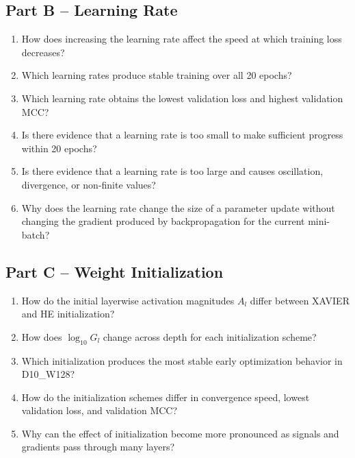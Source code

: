 \documentclass[11pt]{article}
\begin{document}
\subsection*{Part B -- Learning Rate}
\begin{enumerate}
    \item How does increasing the learning rate affect the speed at which training loss decreases?
    \item Which learning rates produce stable training over all 20 epochs?
    \item Which learning rate obtains the lowest validation loss and highest validation MCC?
    \item Is there evidence that a learning rate is too small to make sufficient progress within 20 epochs?
    \item Is there evidence that a learning rate is too large and causes oscillation, divergence, or non-finite values?
    \item Why does the learning rate change the size of a parameter update without changing the gradient produced by backpropagation for the current mini-batch?
\end{enumerate}

\subsection*{Part C -- Weight Initialization}
\begin{enumerate}
    \item How do the initial layerwise activation magnitudes $A_l$ differ between XAVIER and HE initialization?
    \item How does $\log_{10}G_l$ change across depth for each initialization scheme?
    \item Which initialization produces the most stable early optimization behavior in D10\_W128?
    \item How do the initialization schemes differ in convergence speed, lowest validation loss, and validation MCC?
    \item Why can the effect of initialization become more pronounced as signals and gradients pass through many layers?
\end{enumerate}
\end{document}
